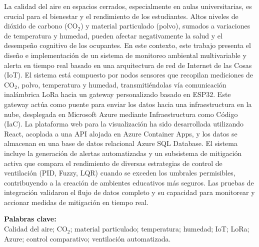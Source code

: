 
La calidad del aire en espacios cerrados, especialmente en aulas universitarias, es crucial para el bienestar y el rendimiento de los estudiantes. Altos niveles de dióxido de carbono (CO\(_2\)) y material particulado (polvo), sumados a variaciones de temperatura y humedad, pueden afectar negativamente la salud y el desempeño cognitivo de los ocupantes. En este contexto, este trabajo presenta el diseño e implementación de un sistema de monitoreo ambiental multivariable y alerta en tiempo real basado en una arquitectura de red de Internet de las Cosas (IoT). El sistema está compuesto por nodos sensores que recopilan mediciones de CO\(_2\), polvo, temperatura y humedad, transmitiéndolas vía comunicación inalámbrica LoRa hacia un gateway personalizado basado en ESP32. Este gateway actúa como puente para enviar los datos hacia una infraestructura en la nube, desplegada en Microsoft Azure mediante Infraestructura como Código (IaC). La plataforma web para la visualización ha sido desarrollada utilizando React, acoplada a una API alojada en Azure Container Apps, y los datos se almacenan en una base de datos relacional Azure SQL Database. El sistema incluye la generación de alertas automatizadas y un subsistema de mitigación activa que compara el rendimiento de diversas estrategias de control de ventilación (PID, Fuzzy, LQR) cuando se exceden los umbrales permisibles, contribuyendo a la creación de ambientes educativos más seguros. Las pruebas de integración validaron el flujo de datos completo y su capacidad para monitorear y accionar medidas de mitigación en tiempo real.

\noindent \textbf{Palabras clave:}\\
\noindent Calidad del aire; CO\(_2\); material particulado; temperatura; humedad; IoT; LoRa; Azure; control comparativo; ventilación automatizada.